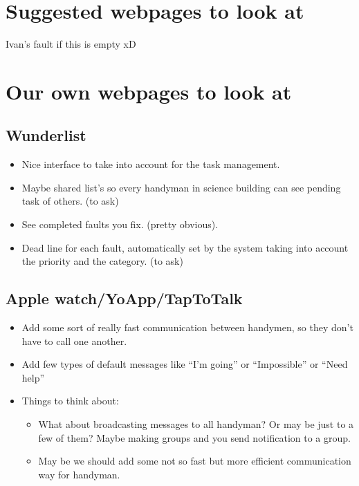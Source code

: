 \section{Suggested webpages to look at}

Ivan's fault if this is empty xD

\section{Our own webpages to look at}

\subsection{Wunderlist}

\begin{itemize}
\item Nice interface to take into account for the task management.
\item Maybe shared list's so every handyman in science building can see pending task of others. (to ask)
\item See completed faults you fix. (pretty obvious).
\item Dead line for each fault, automatically set by the system taking into account the priority and the category. (to ask)
\end{itemize}


\subsection{Apple watch/YoApp/TapToTalk}

\begin{itemize}
\item Add some sort of really fast communication between handymen, so they don't have to call one another.
\item Add few types of default messages like “I'm going” or “Impossible” or “Need help”
\item Things to think about:
\begin{itemize}\label{AppleWatch}
\item What about broadcasting messages to all handyman? Or may be just to a few of them? Maybe making groups and you send notification to a group.
\item May be we should add some not so fast but more efficient communication way for handyman.
\end{itemize}
\end{itemize}

